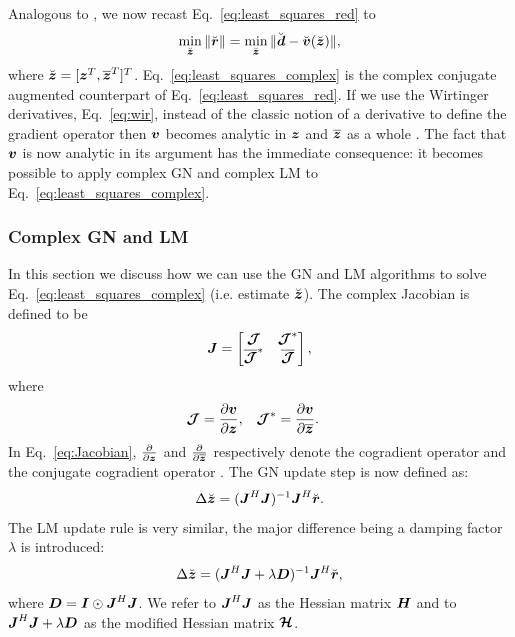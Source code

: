 \documentclass[useAMS,usenatbib]{mn2e}
\newcommand{\bz}{\bmath{z}}
\newcommand{\br}{\bmath{r}}
\newcommand{\bd}{\bmath{d}}
\newcommand{\bv}{\bmath{v}}
\newcommand{\bJ}{\bmath{J}}
\newcommand{\bD}{\bmath{D}}
\newcommand{\bH}{\bmath{H}}
\newcommand{\bI}{\bmath{I}}
\newcommand{\bmJ}{\bmath{\mathcal{J}}}
\newcommand{\bmH}{\bmath{\mathcal{H}}}
\newcommand{\conj}[1]{\overline{#1}}
\begin{document}
Analogous to \cite{Smirnov2015}, we now recast Eq.~\eqref{eq:least_squares_red} to 
\begin{equation}
\label{eq:least_squares_complex}
\min_{\breve{\bz}} \|\breve{\br}\| = \min_{\breve{\bz}} \|\breve{\bd} - \breve{\bv}(\breve{\bz})\|, 
\end{equation}
where $\breve{\bz} = [\bz^T,\conj{\bz}^T]^T$. Eq.~\eqref{eq:least_squares_complex} is the complex conjugate augmented counterpart of Eq.~\eqref{eq:least_squares_red}.
If we use the Wirtinger derivatives, Eq.~\eqref{eq:wir}, instead of the classic notion of a derivative to define the gradient operator then 
$\bv$ becomes analytic in $\bz$ and $\conj{\bz}$ as a whole \citep{Smirnov2015}. The fact that $\bv$ is now analytic in its argument has the immediate consequence: it becomes possible to apply complex GN
and complex LM to Eq.~\eqref{eq:least_squares_complex}. 

\subsubsection{Complex GN and LM}
In this section we discuss how we can use the GN and LM algorithms to solve Eq.~\eqref{eq:least_squares_complex} (i.e. estimate $\breve{\bz}$). The complex Jacobian is defined to be
\begin{equation}
\label{eq:Jacobian}
\bJ = \begin{bmatrix}
       \bmJ & \bmJ^*\\
       \conj{\bmJ}^* & \conj{\bmJ} 
      \end{bmatrix},
\end{equation}
where 
\begin{align}
\bmJ &= \frac{\partial \bv}{\partial \bz}, & \bmJ^* &= \frac{\partial \bv}{\partial \conj{\bz}}. 
\end{align}
In Eq.~\eqref{eq:Jacobian}, $\frac{\partial}{\partial \bz}$ and $\frac{\partial}{\partial \conj{\bz}}$ respectively denote the cogradient operator and the conjugate cogradient operator \citep{Sorber2012}.
The GN update step is now defined as:
\begin{equation}
\label{eq:GN_update}
 \Delta \breve{\bz} = (\bJ^H\bJ)^{-1}\bJ^H\breve{\br}.
\end{equation}
The LM update rule is very similar, the major difference being a damping factor $\lambda$ is introduced:
\begin{equation}
\label{eq:LM_update}
\Delta \breve{\bz} = (\bJ^H\bJ + \lambda\bD)^{-1}\bJ^H\breve{\br},
\end{equation}
where $\bD=\bI\odot\bJ^H\bJ$. We refer to $\bJ^H\bJ$ as the Hessian matrix $\bH$ and to $\bJ^H\bJ + \lambda\bD$ as the modified Hessian matrix $\bmH$. 
\end{document}
